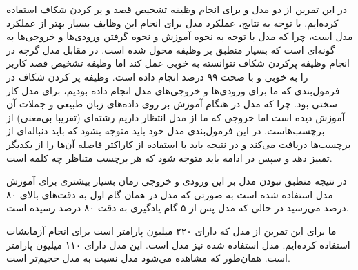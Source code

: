 \documentclass[12pt, a4paper]{book}
\begin{document}
در این تمرین از دو مدل  و  برای انجام وظیفه تشخیص قصد و پر کردن شکاف
استفاده کرده‌ایم. با توجه به نتایج، عملکرد مدل  برای انجام این وظایف بسیار بهتر از
عملکرد مدل  است، چرا که مدل  با توجه به نحوه آموزش و نحوه گرفتن ورودی‌ها و خروجی‌ها
به گونه‌ای است که بسیار منطبق بر وظیفه محول شده است. در مقابل مدل  گرچه در انجام
وظیفه پرکردن شکاف نتوانسته به خوبی عمل کند اما وظیفه تشخیص قصد کاربر را به خوبی و با صحت ۹۹ درصد
انجام داده است. وظیفه پر کردن شکاف در فرمول‌بندی که ما برای ورودی‌ها و خروجی‌های مدل 
انجام داده بودیم، برای مدل  کار سختی بود. چرا که مدل  در هنگام آموزش بر روی داده‌های زبان
طبیعی و جملات آن آموزش دیده است اما خروجی که ما از مدل انتظار داریم رشته‌ای (تقریبا بی‌معنی) از
برچسب‌هاست. در این فرمول‌بندی مدل خود باید متوجه بشود که باید دنباله‌ای از برچسب‌ها دریافت می‌کند و
در نتیجه باید با استفاده از کاراکتر فاصله آن‌ها را از یکدیگر تمییز دهد و سپس در ادامه باید
متوجه شود که هر برچسب متناظر چه کلمه است.

در نتیجه منطبق نبودن مدل  بر این ورودی و خروجی زمان بسیار بیشتری برای آموزش مدل استفاده
شده است به صورتی که مدل  در همان گام اول به دقت‌های بالای ۸۰ درصد می‌رسید در حالی که
مدل  پس از ۵ گام یادگیری به دقت ۸۰ درصد رسیده است.

ما برای این تمرین از مدل  که دارای ۲۲۰ میلیون پارامتر است برای انجام آزمایشات استفاده کرده‌ایم.
مدل  استفاده شده نیز مدل  است. این مدل دارای ۱۱۰ میلیون پارامتر است.
همان‌طور که مشاهده می‌شود مدل  نسبت به مدل  حجیم‌تر است.
\end{document}
